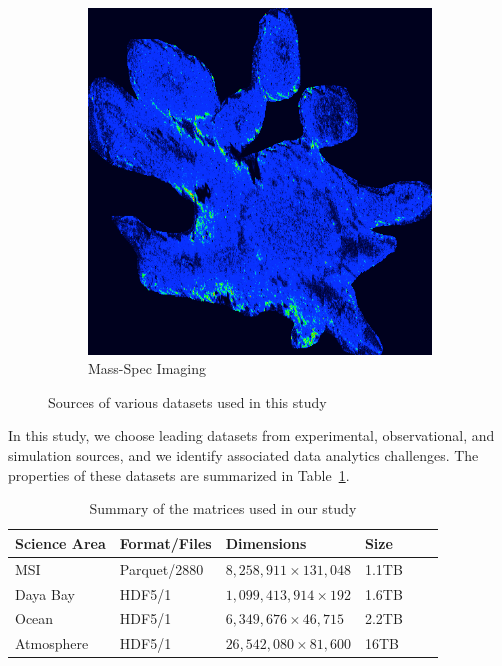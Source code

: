 \begin{figure}
\begin{subfigure}[b]{0.22\textwidth}
\includegraphics[width=\textwidth]{fig/mass-spec.png}
\caption{Mass-Spec Imaging}
\label{fig:mass-spec}
\end{subfigure}
\caption{Sources of various datasets used in this study}\label{fig:datasets}
\end{figure}
In this study, we choose leading datasets from experimental, observational, and simulation sources, and we identify associated data analytics challenges. 
The properties of these datasets are summarized in Table~\ref{table:datasets}.

\begin{table}[ht]
\centering
\caption{Summary of the matrices used in our study}
\label{table:datasets}
\begin{tabular}{p{1.5cm}lllll@{}}
\toprule
Science Area & Format/Files & Dimensions & Size  \\ \midrule
MSI      & Parquet/2880        &  $8,258,911 \times 131,048$          & 1.1TB  \\
Daya Bay & HDF5/1      &   $1,099,413,914 \times 192$         & 1.6TB \\
Ocean              & HDF5/1      &  $6,349,676 \times 46,715$          & 2.2TB \\
Atmosphere           & HDF5/1       & $26,542,080 \times 81,600$           & 16TB \\ \bottomrule
\end{tabular}
\end{table}



